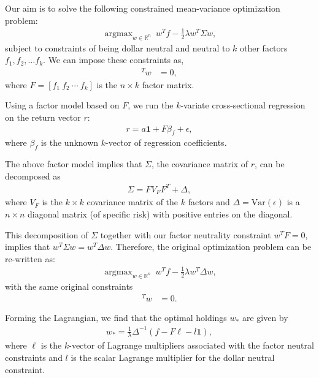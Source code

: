 \documentclass{amsart}
\theoremstyle{plain}
\numberwithin{equation}{section}
\DeclareMathOperator*{\argmax}{argmax}
\begin{document}
Our aim is to solve the following constrained mean-variance optimization
problem:
\begin{align*}
\argmax_{w \in \mathbb{R}^n} ~ w^{T} f - \frac{1}{2} \lambda w^{T} \Sigma w,
\end{align*}
subject to constraints of being dollar neutral and 
neutral to $k$ other factors $f_1, f_2, \ldots f_k$. We can impose 
these  constraints as,
\begin{align*}
[\mathbf{1} ~ F]^{T} w &= 0,
\end{align*}
where $F =[f_1 ~ f_2 ~ \cdots ~ f_k]$ is the $n \times k$
factor matrix.  

Using a factor model based on $F$, we run the 
$k$-variate cross-sectional regression on the 
return vector $r$:
\begin{align*}
r = a\mathbf{1} + F \beta_f + \epsilon,
\end{align*}
where $\beta_f$ is the unknown $k$-vector
of regression coefficients.

The above factor model implies that $\Sigma$,
the covariance matrix of $r$, can be decomposed as
\begin{align*}
\Sigma = FV_{F}F^{T} + \Delta,
\end{align*}
where $V_{F}$ is the $k \times k$ 
covariance matrix of the $k$ factors and 
$\Delta = \mathrm{Var}(\epsilon)$ is a $n \times n$ diagonal matrix (of specific risk) with 
positive entries on the diagonal.

This decomposition of $\Sigma$ together with our 
factor neutrality constraint $w^{T}F=0$, implies that
$w^{T} \Sigma w =  w^{T} \Delta w$. 
Therefore, the original optimization problem can be re-written 
as:
\begin{align*}
\argmax_{w \in \mathbb{R}^n} ~ w^{T} f - \frac{1}{2} \lambda w^{T} \Delta w,
\end{align*}
with the same original constraints
\begin{align*}
[\mathbf{1} ~ F]^{T} w &= 0.
\end{align*}

Forming the Lagrangian, we find that the optimal holdings
$w_{*}$ are given by
\begin{align*}
w_{*} = \frac{1}{\lambda} \Delta^{-1} \left(f - F \boldsymbol{\ell} - l \mathbf{1}\right),
\end{align*}
where $\boldsymbol{\ell}$ is the $k$-vector of Lagrange multipliers associated with the 
factor neutral constraints and $l$ is the scalar Lagrange multiplier for the dollar neutral 
constraint. 
\end{document}
